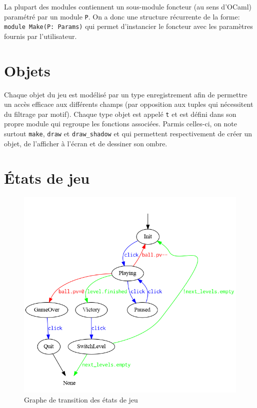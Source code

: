 \documentclass[french]{template}
\begin{document}
La plupart des modules contiennent un sous-module foncteur (au sens d'OCaml) paramétré par un module \texttt{P}. On a donc une structure récurrente de la forme: \texttt{module Make(P: Params)} qui permet d'instancier le foncteur avec les paramètres fournis par l'utilisateur.

\section{Objets}

Chaque objet du jeu est modélisé par un type enregistrement afin de permettre un accès efficace aux différents champs (par opposition aux tuples qui nécessitent du filtrage par motif). Chaque type objet est appelé \texttt{t} et est défini dans son propre module qui regroupe les fonctions associées. Parmis celles-ci, on note surtout \texttt{make}, \texttt{draw} et \texttt{draw\_shadow} et qui permettent respectivement de créer un objet, de l'afficher à l'écran et de dessiner son ombre.

\section{États de jeu}


\begin{figure}
    \centering
    \includegraphics[width=\textwidth]{img/graph.png}
    \caption{Graphe de transition des états de jeu}
    \label{fig:graph}
\end{figure}
\end{document}
